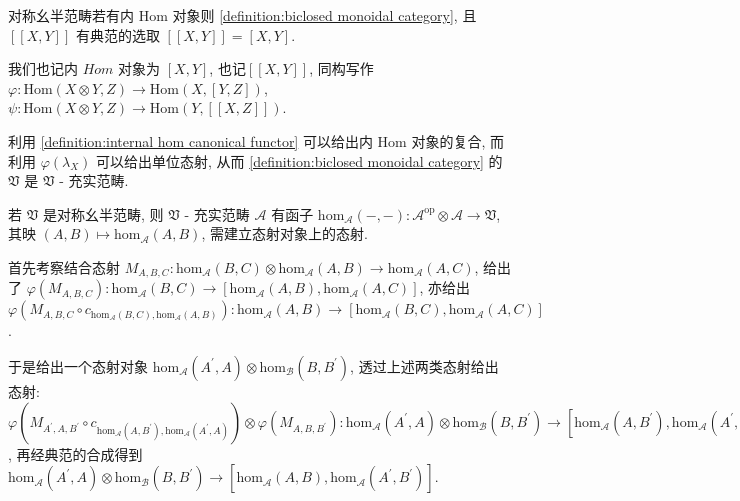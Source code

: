 \begin{lemma}
    对称幺半范畴若有内 \(\mathrm{Hom}\) 对象则 \ref{definition:biclosed monoidal category},
    且 \([\![X,Y]\!]\) 有典范的选取 \([\![X,Y]\!] = [X,Y]\).
\end{lemma}

\begin{remark}
    我们也记内 \(Hom\) 对象为 \([X,Y]\), 也记\([\![X,Y]\!]\), 同构写作 
    \(\varphi : \mathrm{Hom} (X \otimes Y,Z) \to \mathrm{Hom} (X,[Y,Z])\),
    \(\psi : \mathrm{Hom} (X \otimes Y,Z) \to \mathrm{Hom} (Y,[\![X,Z]\!])\).
\end{remark}

\begin{remark}
    利用 \ref{definition:internal hom canonical functor} 可以给出内 \(\mathrm{Hom}\) 对象的复合,
    而利用 \(\varphi (\lambda_X)\) 可以给出单位态射, 从而 \ref{definition:biclosed monoidal category} 的 \(\mathfrak{V}\) 是 \(\mathfrak{V}\) - 充实范畴.
\end{remark}

\begin{definition}
    若 \(\mathfrak{V}\) 是对称幺半范畴, 则 \(\mathfrak{V}\) - 充实范畴 \(\mathcal{A}\) 有函子 \(\mathrm{hom}_{\mathcal{A}} (-,-) : \mathcal{A}^{\mathrm{op}} \otimes \mathcal{A} \to \mathfrak{V}\),
    其映 \((A,B) \mapsto \mathrm{hom}_{\mathcal{A}} (A,B)\), 需建立态射对象上的态射.

    首先考察结合态射 \(M_{A,B,C} : \mathrm{hom}_{\mathcal{A}} (B,C) \otimes \mathrm{hom}_{\mathcal{A}} (A,B) \to \mathrm{hom}_{\mathcal{A}} (A,C)\), 给出了
    \(\varphi(M_{A,B,C}) : \mathrm{hom}_{\mathcal{A}} (B,C) \to [\mathrm{hom}_{\mathcal{A}} (A,B),\mathrm{hom}_{\mathcal{A}} (A,C)]\), 亦给出
    \(\varphi(M_{A,B,C} \circ c_{\mathrm{hom}_{\mathcal{A}} (B,C),\mathrm{hom}_{\mathcal{A}} (A,B)}) : \mathrm{hom}_{\mathcal{A}} (A,B) \to [\mathrm{hom}_{\mathcal{A}} (B,C),\mathrm{hom}_{\mathcal{A}} (A,C)]\).

    于是给出一个态射对象 \(\mathrm{hom}_{\mathcal{A}} (A^\prime,A) \otimes \mathrm{hom}_{\mathcal{B}} (B,B^\prime)\), 透过上述两类态射给出态射:
    \(\varphi(M_{A^\prime,A,B^\prime} \circ c_{\mathrm{hom}_{\mathcal{A}} (A,B^\prime),\mathrm{hom}_{\mathcal{A}} (A^\prime,A)}) \otimes \varphi(M_{A,B,B^\prime}) : \mathrm{hom}_{\mathcal{A}} (A^\prime,A) \otimes \mathrm{hom}_{\mathcal{B}} (B,B^\prime) \to [\mathrm{hom}_{\mathcal{A}} (A,B^\prime),\mathrm{hom}_{\mathcal{A}} (A^\prime,B^\prime)] \otimes [\mathrm{hom}_{\mathcal{A}} (A,B),\mathrm{hom}_{\mathcal{A}} (A,B^\prime)]\),
    再经典范的合成得到 \(\mathrm{hom}_{\mathcal{A}} (A^\prime,A) \otimes \mathrm{hom}_{\mathcal{B}} (B,B^\prime) \to [\mathrm{hom}_{\mathcal{A}} (A,B), \mathrm{hom}_{\mathcal{A}} (A^\prime,B^\prime)]\).
\end{definition}

\newpage
